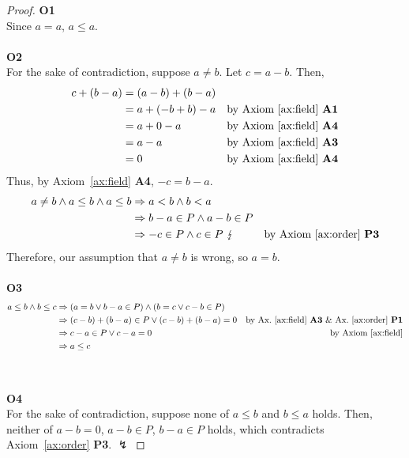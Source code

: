 \documentclass[../main.tex]{subfiles}
\begin{document}
\begin{proof}
    \textbf{O1}\\
    Since $a = a$, $a \leq a$.
    \\
    \\
    \textbf{O2}\\
    For the sake of contradiction, suppose $a \neq b$.
    Let $c = a - b$.
    Then, 
    \begin{align*}
        c + (b - a) &= (a - b) + (b - a)\\
                    &= a + (-b + b) - a &\text{by Axiom~\ref{ax:field} \textbf{A1}}\\
                    &= a + 0 - a &\text{by Axiom~\ref{ax:field} \textbf{A4}}\\
                    &= a - a &\text{by Axiom~\ref{ax:field} \textbf{A3}}\\
                    &= 0 &\text{by Axiom~\ref{ax:field} \textbf{A4}}\\
    \end{align*}
    Thus, by Axiom~\ref{ax:field} \textbf{A4}, $-c = b - a$.
    \begin{align*}
        a \neq b \wedge a \leq b \wedge a \leq b &\Rightarrow a < b \wedge b < a \\
                                                 &\Rightarrow b - a \in P \wedge a - b \in P\\
                                                 &\Rightarrow -c \in P \wedge c \in P \ \lightning &\text{by Axiom~\ref{ax:order} \textbf{P3}}
    \end{align*}
    Therefore, our assumption that $a \neq b$ is wrong, so $a = b$.
    \\
    \\
    \textbf{O3}
    \begin{align*}
        a \leq b \wedge b \leq c &\Rightarrow (a = b \vee b - a \in P) \wedge (b = c \vee c - b \in P)\\
                                 &\Rightarrow (c - b) + (b - a) \in P \vee (c - b) + (b - a) = 0 &\text{by Ax.~\ref{ax:field} \textbf{A3} \& Ax.~\ref{ax:order} \textbf{P1}}\\
                                 &\Rightarrow c - a \in P \vee c - a = 0&\text{by Axiom~\ref{ax:field}}\\
                                 &\Rightarrow a \leq c
    \end{align*}
    \\
    \\
    \textbf{O4}\\
    For the sake of contradiction, suppose none of $a \leq b$ and $b \leq a$ holds.
    Then, neither of $a - b = 0$, $a - b \in P$, $b - a \in P$ holds, which contradicts Axiom~\ref{ax:order} \textbf{P3}. $\lightning$
\end{proof}
\end{document}
